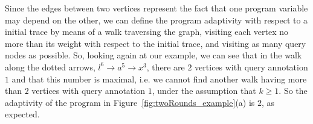 \begin{example}[twoRounds]
      
      Since the edges between two vertices represent the fact that one program variable may depend on the other,
      we can define the program adaptivity with respect to a initial trace by means of a walk traversing the graph, visiting each vertex no more than its weight with respect to the initial trace, and visiting as many query nodes as possible.
      So, looking again at our example, we can see that
      in the walk along the dotted arrows,  $l^{6} \to a^5 \to x^3 $, there are $2$ vertices with query annotation $1$ and that this number is maximal, i.e. we cannot find another walk having more than $2$ vertices with query annotation $1$, under the assumption that $k \geq 1$. So the adaptivity of the program in Figure~\ref{fig:twoRounds_example}(a)  is $2$,
      as expected.
{\small
\begin{figure}
\centering
\begin{subfigure}{.8\textwidth}
\end{subfigure}
\end{figure}}
\end{example}
